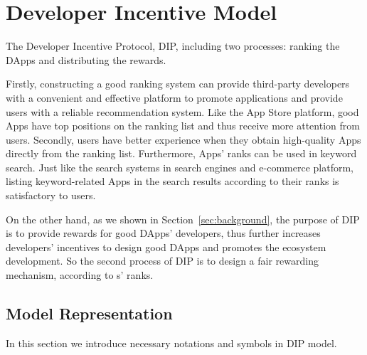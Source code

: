 \section{Developer Incentive Model}
The Developer Incentive Protocol, DIP, including two processes: ranking the DApps and distributing the rewards.

Firstly, constructing a good ranking system can provide third-party developers
with a convenient and effective platform to promote applications and provide
users with a reliable recommendation system. Like the App Store platform, good
Apps have top positions on the ranking list and thus receive more attention
from users. Secondly, users have better experience when they obtain
high-quality Apps directly from the ranking list. Furthermore, Apps' ranks can
be used in keyword search. Just like the search systems in search engines and
e-commerce platform,  listing keyword-related Apps in the search results according to their ranks is satisfactory to users.

On the other hand, as we shown in Section~\ref{sec:background}, the purpose of DIP is to provide rewards for good DApps' developers, thus further increases developers' incentives to design good DApps and promotes the ecosystem development. So the second process of DIP is to design a fair rewarding mechanism, according to {\dapp}s' ranks.

\subsection{Model Representation}
\label{subsection:parameters}
In this section we introduce necessary notations and symbols in DIP model.


